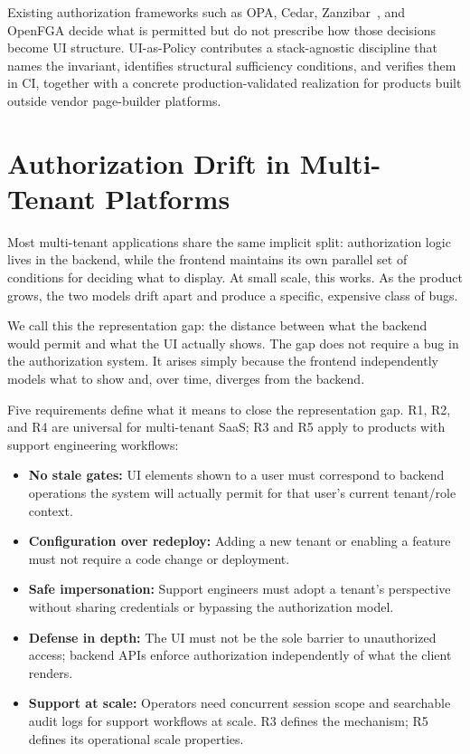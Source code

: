 \documentclass[10pt,journal]{IEEEtran}
\newcommand{\uiPolicy}{UI-as-Policy}
\begin{document}
Existing authorization frameworks such as OPA, Cedar, Zanzibar~\cite{zanzibar}, and
OpenFGA decide what is permitted but do not prescribe how those decisions
become UI structure. \uiPolicy{} contributes a stack-agnostic discipline that names the invariant,
identifies structural sufficiency conditions, and verifies them in CI, together
with a concrete production-validated realization for products built outside
vendor page-builder platforms.

\section{Authorization Drift in Multi-Tenant Platforms}

Most multi-tenant applications share the same implicit split: authorization
logic lives in the backend, while the frontend maintains its own parallel set
of conditions for deciding what to display. At small scale, this works. As
the product grows, the two models drift apart and produce a specific,
expensive class of bugs.

We call this the representation gap: the distance between what the
backend would permit and what the UI actually shows. The gap does not require
a bug in the authorization system. It arises simply because the frontend
independently models what to show and, over time, diverges from the backend.

Five requirements define what it means to close the representation gap.
R1, R2, and R4 are universal for multi-tenant SaaS; R3 and R5 apply to
products with support engineering workflows:
\begin{itemize}
  \item[\textbf{R1}] \textbf{No stale gates:} UI elements shown to a user
    must correspond to backend operations the system will actually permit
    for that user's current tenant/role context.

  \item[\textbf{R2}] \textbf{Configuration over redeploy:} Adding a new
    tenant or enabling a feature must not require a code change or
    deployment.

  \item[\textbf{R3}] \textbf{Safe impersonation:} Support engineers must
    adopt a tenant's perspective without sharing credentials or bypassing
    the authorization model.

  \item[\textbf{R4}] \textbf{Defense in depth:} The UI must not be the
    sole barrier to unauthorized access; backend APIs enforce authorization
    independently of what the client renders.

  \item[\textbf{R5}] \textbf{Support at scale:}
    Operators need concurrent session scope and searchable audit logs for
    support workflows at scale. R3 defines the mechanism; R5 defines its
    operational scale properties.
\end{itemize}
\end{document}
